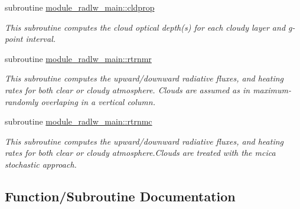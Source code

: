 {\bf }\par
\begin{DoxyCompactItemize}
\item 
subroutine \hyperlink{group__module__radlw__main_ga735598d1b11b0a090d142977a8f64f89}{module\+\_\+radlw\+\_\+main\+::cldprop}
\begin{DoxyCompactList}\small\item\em This subroutine computes the cloud optical depth(s) for each cloudy layer and g-\/point interval. \end{DoxyCompactList}\end{DoxyCompactItemize}

{\bf }\par
\begin{DoxyCompactItemize}
\item 
subroutine \hyperlink{group__module__radlw__main_gab0d2454aa5b29643b52fa31abe2f97b0}{module\+\_\+radlw\+\_\+main\+::rtrnmr}
\begin{DoxyCompactList}\small\item\em This subroutine computes the upward/downward radiative fluxes, and heating rates for both clear or cloudy atmosphere. Clouds are assumed as in maximum-\/randomly overlaping in a vertical column. \end{DoxyCompactList}\end{DoxyCompactItemize}

{\bf }\par
\begin{DoxyCompactItemize}
\item 
subroutine \hyperlink{group__module__radlw__main_gaf0e13eadc5dad88e144734d2c6b9fd0f}{module\+\_\+radlw\+\_\+main\+::rtrnmc}
\begin{DoxyCompactList}\small\item\em This subroutine computes the upward/downward radiative fluxes, and heating rates for both clear or cloudy atmosphere.\+Clouds are treated with the mcica stochastic approach. \end{DoxyCompactList}\end{DoxyCompactItemize}



\subsection{Function/\+Subroutine Documentation}

